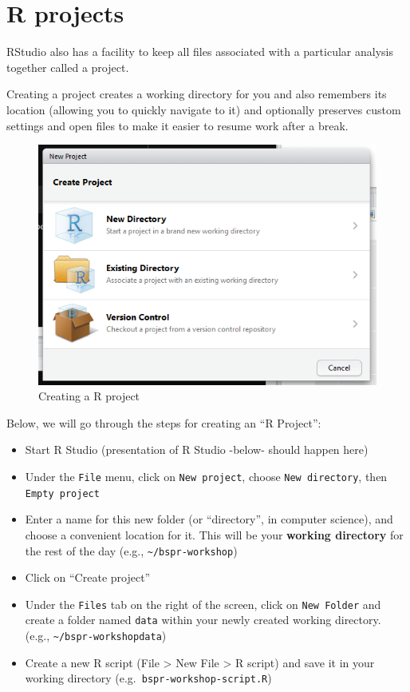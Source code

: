 \documentclass[12pt,]{book}
\providecommand{\tightlist}{%
  \setlength{\itemsep}{0pt}\setlength{\parskip}{0pt}}
\begin{document}
\hypertarget{r-projects}{%
\section{R projects}\label{r-projects}}

RStudio also has a facility to keep all files associated with a particular
analysis together called a project.

Creating a project creates a working directory for you and also remembers
its location (allowing you to quickly navigate to it) and optionally preserves
custom settings and open files to make it easier to resume work after a
break.



\begin{figure}

{\centering \includegraphics[width=0.8\linewidth]{img/rstudio_create_project} 

}

\caption{Creating a R project}\label{fig:r-projects}
\end{figure}

Below, we will go through the steps for creating an ``R Project'':

\begin{itemize}
\tightlist
\item
  Start R Studio (presentation of R Studio -below- should happen here)
\item
  Under the \texttt{File} menu, click on \texttt{New\ project}, choose \texttt{New\ directory}, then
  \texttt{Empty\ project}
\item
  Enter a name for this new folder (or ``directory'', in computer science), and
  choose a convenient location for it. This will be your \textbf{working directory}
  for the rest of the day (e.g., \texttt{\textasciitilde{}/bspr-workshop})
\item
  Click on ``Create project''
\item
  Under the \texttt{Files} tab on the right of the screen, click on \texttt{New\ Folder} and
  create a folder named \texttt{data} within your newly created working directory. (e.g., \texttt{\textasciitilde{}/bspr-workshopdata})
\item
  Create a new R script (File \textgreater{} New File \textgreater{} R script) and save it in your working
  directory (e.g.~\texttt{bspr-workshop-script.R})
\end{itemize}
\end{document}
